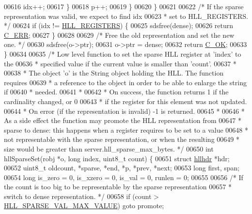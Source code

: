 \begin{DoxyCode}
{{00616                 idx++;
00617             \}
00618             p++;
00619         \}
00620     \}
00621 
00622     \textcolor{comment}{/* If the sparse representation was valid, we expect to find idx}
00623 \textcolor{comment}{     * set to HLL\_REGISTERS. */}
00624     \textcolor{keywordflow}{if} (idx != \hyperlink{hyperloglog_8c_aa053beb90136828dcb46545c7445fc36}{HLL\_REGISTERS}) \{
00625         sdsfree(dense);
00626         \textcolor{keywordflow}{return} \hyperlink{server_8h_af98ac28d5f4d23d7ed5985188e6fb7d1}{C\_ERR};
00627     \}
00628 
00629     \textcolor{comment}{/* Free the old representation and set the new one. */}
00630     sdsfree(o->ptr);
00631     o->ptr = dense;
00632     \textcolor{keywordflow}{return} \hyperlink{server_8h_a303769ef1065076e68731584e758d3e1}{C\_OK};
00633 \}
00634 
00635 \textcolor{comment}{/* Low level function to set the sparse HLL register at 'index' to the}
00636 \textcolor{comment}{ * specified value if the current value is smaller than 'count'.}
00637 \textcolor{comment}{ *}
00638 \textcolor{comment}{ * The object 'o' is the String object holding the HLL. The function requires}
00639 \textcolor{comment}{ * a reference to the object in order to be able to enlarge the string if}
00640 \textcolor{comment}{ * needed.}
00641 \textcolor{comment}{ *}
00642 \textcolor{comment}{ * On success, the function returns 1 if the cardinality changed, or 0}
00643 \textcolor{comment}{ * if the register for this element was not updated.}
00644 \textcolor{comment}{ * On error (if the representation is invalid) -1 is returned.}
00645 \textcolor{comment}{ *}
00646 \textcolor{comment}{ * As a side effect the function may promote the HLL representation from}
00647 \textcolor{comment}{ * sparse to dense: this happens when a register requires to be set to a value}
00648 \textcolor{comment}{ * not representable with the sparse representation, or when the resulting}
00649 \textcolor{comment}{ * size would be greater than server.hll\_sparse\_max\_bytes. */}
00650 \textcolor{keywordtype}{int} hllSparseSet(robj *o, \textcolor{keywordtype}{long} index, uint8\_t count) \{
00651     \textcolor{keyword}{struct} \hyperlink{structhllhdr}{hllhdr} *hdr;
00652     uint8\_t oldcount, *sparse, *end, *p, *prev, *next;
00653     \textcolor{keywordtype}{long} first, span;
00654     \textcolor{keywordtype}{long} is\_zero = 0, is\_xzero = 0, is\_val = 0, runlen = 0;
00655 
00656     \textcolor{comment}{/* If the count is too big to be representable by the sparse representation}
00657 \textcolor{comment}{     * switch to dense representation. */}
00658     \textcolor{keywordflow}{if} (count > \hyperlink{hyperloglog_8c_a5076b83f0a16a0645d7e488b21b05248}{HLL\_SPARSE\_VAL\_MAX\_VALUE}) \textcolor{keywordflow}{goto} promote;
}}
\end{DoxyCode}

